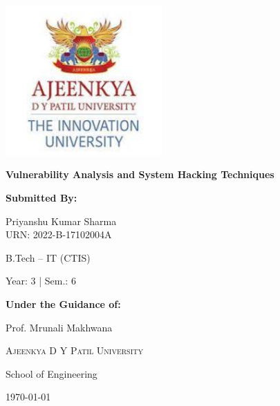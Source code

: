 \documentclass[12pt]{article}
\begin{document}
\begin{titlepage}
    \centering
    \vspace*{1.5cm}

    \includegraphics[width=6cm]{university.png}\\[1.5cm]

    {\LARGE \bfseries Vulnerability Analysis and System Hacking Techniques \par}
    \vspace{1cm}

    {\large \textbf{Submitted By:} \par}
    \vspace{0.2cm}
    {\Large Priyanshu Kumar Sharma \\ URN: 2022-B-17102004A \par}
    {\large B.Tech – IT (CTIS) \par}
    {\large Year: 3 \quad | \quad Sem.: 6 \par}
    \vspace{1cm}

    {\large \textbf{Under the Guidance of:} \par}
    \vspace{0.2cm}
    {\large Prof. Mrunali Makhwana \par}
    \vspace{0.3cm}

    {\scshape\LARGE Ajeenkya D Y Patil University \par}
    \vspace{0.3cm}

    {\Large School of Engineering \par}
    \vspace{1cm}


    {\large \today \par}

\end{titlepage}
\end{document}

